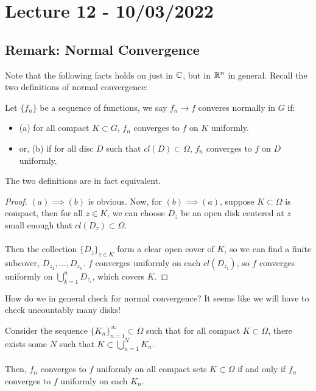 \section{Lecture 12 - 10/03/2022}
\subsection{Remark: Normal Convergence}

Note that the following facts holds on just in $\mathbb{C}$, but in $\mathbb{R}^n$ in general. Recall the two definitions of normal convergence:

\begin{definition}
Let $\{f_n\}$ be a sequence of functions, we say $f_n \to f$ converes normally in $G$ if:
\begin{itemize}
    \item (a) for all compact $K \subset G$, $f_n$ converges to $f$ on $K$ uniformly.
    \item or, (b) if for all disc $D$ such that $cl(D) \subset \Omega$, $f_n$ converges to $f$ on $D$ uniformly.
\end{itemize}
The two definitions are in fact equivalent.
\end{definition}

\begin{proof}
$(a) \implies (b)$ is obvious. Now, for $(b) \implies (a)$, suppose $K \subset \Omega$ is compact, then for all $z \in K$, we can choose $D_z$ be an open disk centered at $z$ small enough that $cl(D_z) \subset \Omega$.\\\\
Then the collection $\{D_z\}_{z \in K}$ form a clear open cover of $K$, so we can find a finite subcover, $D_{z_1}, ..., D_{z_n}$. $f$ converges uniformly on each $cl(D_{z_i})$, so $f$ converges uniformly on $\bigcup_{k = 1}^n D_{z_i}$, which covers $K$.
\end{proof}

How do we in general check for normal convergence? It seems like we will have to check uncountably many disks!

\begin{proposition}
Consider the sequence $\{K_n\}_{n = 1}^\infty \subset \Omega$ such that for all compact $K \subset \Omega$, there exists some $N$ such that $K \subset \bigcup_{n = 1}^N K_n$.\\\\
Then, $f_n$ converges to $f$ uniformly on all compact sets $K \subset \Omega$ if and only if $f_n$ converges to $f$ uniformly on each $K_n$.
\end{proposition}

